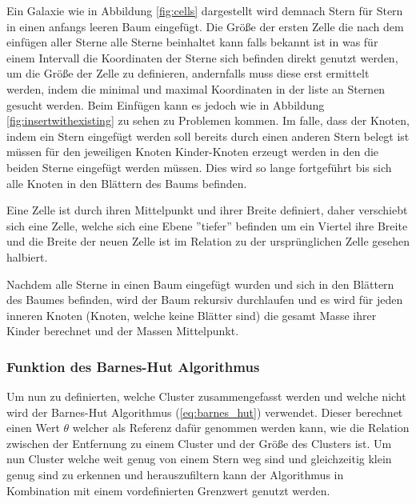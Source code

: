 \par Ein Galaxie wie in Abbildung \ref{fig:cells} dargestellt wird demnach
Stern für Stern in einen anfangs leeren Baum eingefügt. Die Größe der ersten
Zelle die nach dem einfügen aller Sterne alle Sterne beinhaltet kann falls
bekannt ist in was für einem Intervall die Koordinaten der Sterne sich befinden
direkt genutzt werden, um die Größe der Zelle zu definieren, andernfalls muss
diese erst ermittelt werden, indem die minimal und maximal Koordinaten in der
liste an Sternen gesucht werden. Beim Einfügen kann es jedoch wie in Abbildung
\ref{fig:insertwithexisting} zu sehen zu Problemen kommen. Im falle, dass der
Knoten, indem ein Stern eingefügt werden soll bereits durch einen anderen Stern
belegt ist müssen für den jeweiligen Knoten Kinder-Knoten erzeugt werden in den
die beiden Sterne eingefügt werden müssen. Dies wird so lange fortgeführt bis
sich alle Knoten in den Blättern des Baums befinden.

\par Eine Zelle ist durch ihren Mittelpunkt und ihrer Breite definiert, daher
verschiebt sich eine Zelle, welche sich eine Ebene ''tiefer'' befinden um ein
Viertel ihre Breite und die Breite der neuen Zelle ist im Relation zu der
ursprünglichen Zelle gesehen halbiert.

\par Nachdem alle Sterne in einen Baum eingefügt wurden und sich in den
Blättern des Baumes befinden, wird der Baum rekursiv durchlaufen und es wird
für jeden inneren Knoten (Knoten, welche keine Blätter sind) die gesamt Masse
ihrer Kinder berechnet und der Massen Mittelpunkt.

\subsubsection{Funktion des Barnes-Hut Algorithmus}
Um nun zu definierten, welche Cluster zusammengefasst werden und welche nicht
wird der Barnes-Hut Algorithmus (\ref{eq:barnes_hut}) verwendet. Dieser
berechnet einen Wert \( \theta \) welcher als Referenz dafür genommen werden
kann, wie die Relation zwischen der Entfernung zu einem Cluster und der Größe
des Clusters ist. Um nun Cluster welche weit genug von einem Stern weg sind und
gleichzeitig klein genug sind zu erkennen und herauszufiltern kann der
Algorithmus in Kombination mit einem vordefinierten Grenzwert genutzt werden.

